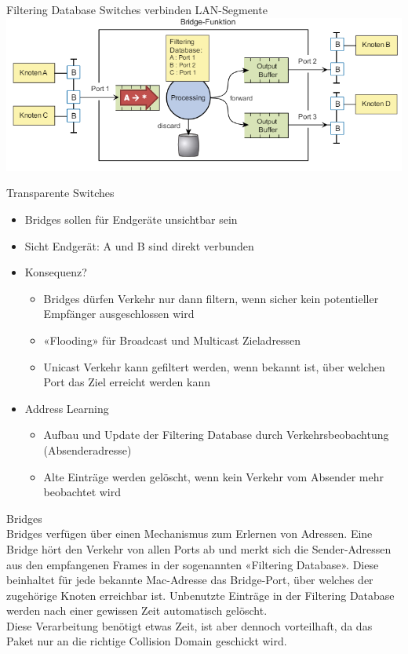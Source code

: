 \begin{definition}{Filtering Database}
    Switches verbinden LAN-Segmente\\
        \includegraphics[width=1\linewidth]{images/filtering_database.png}    
\end{definition}

\begin{concept}{Transparente Switches}
    \begin{itemize}
        \item Bridges sollen für Endgeräte unsichtbar sein
        \item Sicht Endgerät: A und B sind direkt verbunden
        \item Konsequenz?
        \begin{itemize}
            \item Bridges dürfen Verkehr nur dann filtern, wenn sicher kein potentieller Empfänger ausgeschlossen wird
            \item «Flooding» für Broadcast und Multicast Zieladressen
            \item Unicast Verkehr kann gefiltert werden, wenn bekannt ist, über welchen Port das Ziel erreicht werden kann
        \end{itemize}
        \item Address Learning
        \begin{itemize}
            \item Aufbau und Update der Filtering Database durch Verkehrsbeobachtung (Absenderadresse)
            \item Alte Einträge werden gelöscht, wenn kein Verkehr vom Absender mehr beobachtet wird
        \end{itemize}
    \end{itemize}
\end{concept}

\begin{definition}{Bridges}\\
    Bridges verfügen über einen Mechanismus zum Erlernen von Adressen. Eine Bridge hört den Verkehr von allen Ports ab und merkt sich die Sender-Adressen aus den empfangenen Frames in der sogenannten «Filtering Database». Diese beinhaltet für jede bekannte Mac-Adresse das Bridge-Port, über welches der zugehörige Knoten erreichbar ist. Unbenutzte Einträge in der Filtering Database werden nach einer gewissen Zeit automatisch gelöscht. \\
    Diese Verarbeitung benötigt etwas Zeit, ist aber dennoch vorteilhaft, da das Paket nur an die richtige Collision Domain geschickt wird.
\end{definition}

